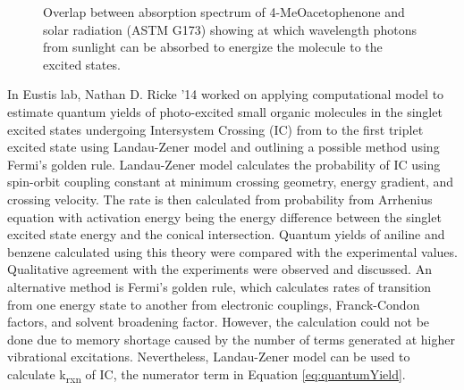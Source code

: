 \documentclass[
journal=jpcbfk, %
manuscript=article]{achemso}
\begin{document}
	\begin{figure}
		\vspace{-20pt}
		\centering
		\caption{Overlap between absorption spectrum of 4-MeOacetophenone and solar radiation (ASTM G173) showing at which wavelength photons from sunlight can be absorbed to energize the molecule to the excited states. }\label{fig:4MeOOverlap}
		\vspace{-20pt}
	\end{figure}
	In Eustis lab, Nathan D. Ricke '14 worked on applying computational model to estimate quantum yields of photo-excited small organic molecules in the singlet excited states undergoing Intersystem Crossing (IC) from to the first triplet excited state using Landau-Zener model and outlining a possible method using Fermi's golden rule.\cite{Ricke2014} Landau-Zener model calculates the probability of IC using spin-orbit coupling constant at minimum crossing geometry, energy gradient, and crossing velocity. The rate is then calculated from probability from Arrhenius equation with activation energy being the energy difference between the singlet excited state energy and the conical intersection. Quantum yields of aniline and benzene calculated using this theory were compared with the experimental values. Qualitative agreement with the experiments were observed and discussed. An alternative method is Fermi's golden rule, which calculates rates of transition from one energy state to another from electronic couplings, Franck-Condon factors, and solvent broadening factor. However, the calculation could not be done due to memory shortage caused by the number of terms generated at higher vibrational excitations. Nevertheless, Landau-Zener model can be used to calculate k\textsubscript{rxn} of IC, the numerator term in Equation \ref{eq:quantumYield}.
	
\end{document}
